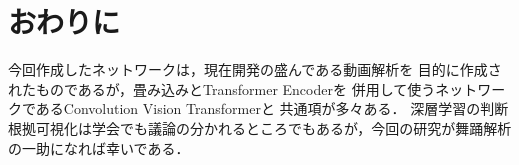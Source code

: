 \section{おわりに}
今回作成したネットワークは，現在開発の盛んである動画解析を
目的に作成されたものであるが，畳み込みとTransformer Encoderを
併用して使うネットワークであるConvolution Vision Transformer\cite{cvt}と
共通項が多々ある．
深層学習の判断根拠可視化は学会でも議論の分かれるところでもあるが，今回の研究が舞踊解析の一助になれば幸いである．